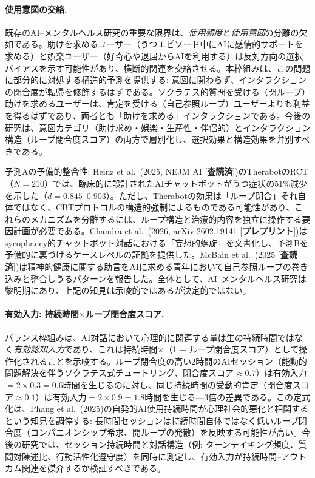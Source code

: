 \documentclass[a4paper,11pt,titlepage]{article}
\begin{document}
\paragraph{使用意図の交絡.}
既存のAI--メンタルヘルス研究の重要な限界は、\emph{使用頻度}と\emph{使用意図}の分離の欠如である。助けを求めるユーザー（うつエピソード中にAIに感情的サポートを求める）と娯楽ユーザー（好奇心や退屈からAIを利用する）は反対方向の選択バイアスを示す可能性があり、横断的関連を交絡させる。本枠組みは、この問題に部分的に対処する構造的予測を提供する: 意図に関わらず、インタラクションの閉合度が転帰を修飾するはずである。ソクラテス的質問を受ける（閉ループ）助けを求めるユーザーは、肯定を受ける（自己参照ループ）ユーザーよりも利益を得るはずであり、両者とも「助けを求める」インタラクションである。今後の研究は、意図カテゴリ（助け求め・娯楽・生産性・伴侶的）とインタラクション構造（ループ閉合度スコア）の両方で層別化し、選択効果と構造効果を弁別すべきである。

予測Aの予備的整合性: Heinz et al.~(2025, NEJM AI [\textbf{査読済}])のTherabotのRCT（$N=210$）では、臨床的に設計されたAIチャットボットがうつ症状の51\%減少を示した（$d = 0.845$--$0.903$）。ただし、Therabotの効果は「ループ閉合」それ自体ではなく、CBTプロトコルの構造的強制によるものである可能性があり、これらのメカニズムを分離するには、ループ構造と治療的内容を独立に操作する要因計画が必要である。Chandra et al.~(2026, arXiv:2602.19141 [\textbf{プレプリント}])はsycophancy的チャットボット対話における「妄想的螺旋」を文書化し、予測Bを予備的に裏づけるケースレベルの証拠を提供した。McBain et al.~(2025 [\textbf{査読済}])は精神的健康に関する助言をAIに求める青年において自己参照ループの巻き込みと整合しうるパターンを報告した。全体として、AI--メンタルヘルス研究は黎明期にあり、上記の知見は示唆的ではあるが決定的ではない。

\paragraph{有効入力: 持続時間$\times$ループ閉合度スコア.}
バランス枠組みは、AI対話において心理的に関連する量は生の持続時間ではなく\textit{有効認知入力}であり、これは持続時間$\times$（1 $-$ ループ閉合度スコア）として操作化されることを示唆する。ループ閉合度の高い2時間のAIセッション（能動的問題解決を伴うソクラテス式チュートリング、閉合度スコア$\approx 0.7$）は有効入力$= 2 \times 0.3 = 0.6$時間を生じるのに対し、同じ持続時間の受動的肯定（閉合度スコア$\approx 0.1$）は有効入力$= 2 \times 0.9 = 1.8$時間を生じる---3倍の差異である。この定式化は、Phang et al.~(2025)の自発的AI使用持続時間が心理社会的悪化と相関するという知見を調停する: 長時間セッションは持続時間自体ではなく低いループ閉合度（コンパニオンシップ希求、開ループの発散）を反映する可能性が高い。今後の研究では、セッション持続時間と対話構造（例: ターンテイキング頻度、質問対陳述比、行動活性化遵守度）を同時に測定し、有効入力が持続時間--アウトカム関連を媒介するか検証すべきである。
\end{document}
